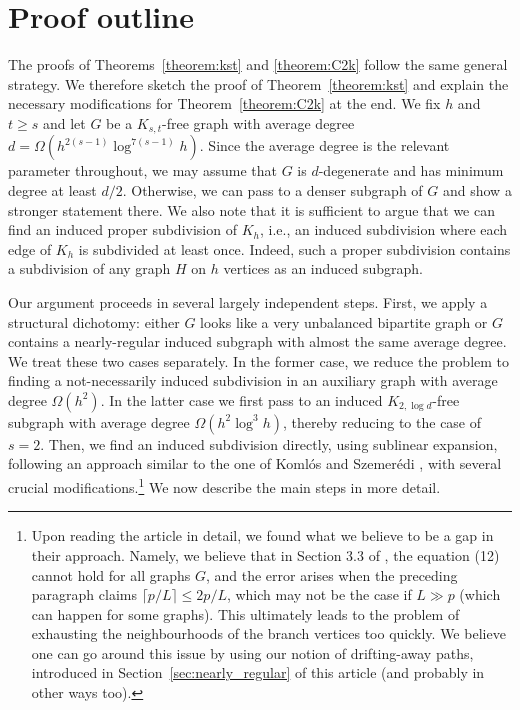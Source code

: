 \documentclass[10pt, a4paper]{article}
\numberwithin{theorem}{section} %
\theoremstyle{remark}
\theoremstyle{definition}
\begin{document}
\section{Proof outline}\label{sec:outline}
The proofs of Theorems~\ref{theorem:kst} and \ref{theorem:C2k} follow the same general strategy.
We therefore sketch the proof of Theorem~\ref{theorem:kst} and explain the necessary modifications for Theorem~\ref{theorem:C2k} at the end.
We fix $h$ and $t \geq s$ and let $G$ be a $K_{s, t}$-free graph with average degree $d = \Omega(h^{2(s-1)}\log^{7(s-1)} h)$.
Since the average degree is the relevant parameter throughout, we may assume that $G$ is $d$-degenerate and has minimum degree at least $d/2$.
Otherwise, we can pass to a denser subgraph of $G$ and show a stronger statement there.
We also note that it is sufficient to argue that we can find an induced proper subdivision of $K_h$, i.e., an induced subdivision where each edge of $K_h$ is subdivided at least once. 
Indeed, such a proper subdivision contains a subdivision of any graph $H$ on $h$ vertices as an induced subgraph.

Our argument proceeds in several largely independent steps.
First, we apply a structural dichotomy: either $G$ looks like a very unbalanced bipartite graph or $G$ contains a nearly-regular induced subgraph with almost the same average degree.
We treat these two cases separately.
In the former case, we reduce the problem to finding a not-necessarily induced subdivision in an auxiliary graph with average degree $\Omega(h^2)$.
In the latter case we first pass to an induced $K_{2, \log d}$-free subgraph with average degree $\Omega(h^2\log^3h)$, thereby reducing to the case of $s = 2$.
Then, we find an induced subdivision directly, using sublinear expansion, following an approach similar to the one of Koml\'os and Szemer\'edi \cite{KomlosSzemeredi96}, with several crucial modifications.\footnote{Upon reading the article \cite{KomlosSzemeredi96} in detail, we found what we believe to be a gap in their approach. Namely, we believe that in Section 3.3 of \cite{KomlosSzemeredi96}, the equation (12) cannot hold for all graphs $G$, and the error arises when the preceding paragraph claims $\lceil p/L\rceil \leq 2p/L$, which may not be the case if $L\gg p$ (which can happen for some graphs). This ultimately leads to the problem of exhausting the neighbourhoods of the branch vertices too quickly. We believe one can go around this issue by using our notion of drifting-away paths, introduced in Section~\ref{sec:nearly_regular} of this article (and probably in other ways too).} We now describe the main steps in more detail.
\end{document}
